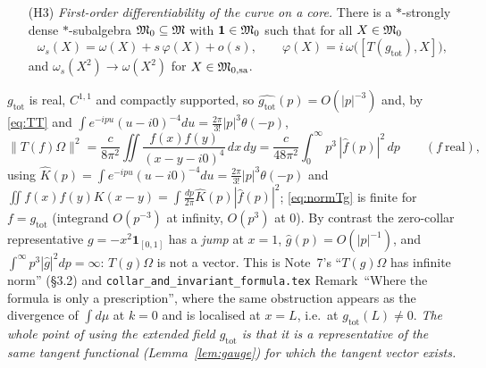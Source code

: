 \documentclass[11pt]{article}
\newcommand{\Om}{\Omega}
\newcommand{\one}{\mathbf 1}
\newcommand{\Hil}{\mathcal H}
\newcommand{\norm}[1]{\lVert#1\rVert}
\newcommand{\HT}{\Hil_T}
\newcommand{\gtot}{g_{\mathrm{tot}}}
\begin{document}
\begin{itemize}[leftmargin=3em]
\begin{itemize}[leftmargin=1.6em]
  with $\norm{\gtot-f_n}_{H^{3/2}}\to0$; equivalently $a:=T(\gtot)\Om\in\HT$
  (Definition~\ref{def:HT}).
 \end{itemize}
 (H2$'$) is what the Carpi--Weiner energy bound $\norm{T(f)\psi}\le C\norm f_{3/2}\norm{(1+L_0)\psi}$
 (CDIT Prop.~2.2(4)) delivers, and it is verified, together with (H1) and (H2), in
 \texttt{rigor/implementation\_C11.tex}.  Without it, (H2) alone would permit an operator $T(\gtot)$
 obtained by some other extension procedure whose vacuum vector differs from $\lim_nT(f_n)\Om$ by an
 element of $\HT^\perp$, and the $c$-linearity Theorem~\ref{thm:linear} would fail.
\item[(H3)] \emph{First-order differentiability of the curve on a core.}  There is a $*$-strongly dense
 $*$-subalgebra $\mathfrak M_0\subseteq\mathfrak M$ with $\one\in\cM_0$ such that for all $X\in\mathfrak M_0$
 \begin{equation}\label{eq:H3}
  \omega_s(X)=\omega(X)+s\,\varphi(X)+o(s),\qquad \varphi(X)=i\,\omega\bigl([T(\gtot),X]\bigr),
 \end{equation}
 and $\omega_s(X^2)\to\omega(X^2)$ for $X\in\mathfrak M_{0,\mathrm{sa}}$.
\end{itemize}

\begin{remark}[Why $T(\gtot)\Om$ is a vector while $T(g\mathbf 1_I)\Om$ is not]\label{rem:vector}
$\gtot$ is real, $C^{1,1}$ and compactly supported, so $\widehat{\gtot}(p)=O(|p|^{-3})$ and, by
\eqref{eq:TT} and $\int e^{-ipu}(u-i0)^{-4}du=\frac{2\pi}{3!}|p|^3\theta(-p)$,
\begin{equation}\label{eq:normTg}
 \norm{T(f)\Om}^2=\frac{c}{8\pi^2}\iint\frac{f(x)f(y)}{(x-y-i0)^4}\,dx\,dy
  =\frac{c}{48\pi^2}\int_0^\infty p^3\,|\widehat f(p)|^2\,dp\qquad (f\ \text{real}),
\end{equation}
using $\widehat K(p)=\int e^{-ipu}(u-i0)^{-4}du=\frac{2\pi}{3!}|p|^3\theta(-p)$ and
$\iint f(x)f(y)K(x-y)=\int\frac{dp}{2\pi}\widehat K(p)|\widehat f(p)|^2$;  \eqref{eq:normTg}
is finite for $f=\gtot$ (integrand $O(p^{-3})$ at infinity, $O(p^3)$ at $0$).  By contrast the zero-collar
representative $g=-x^2\mathbf 1_{[0,1]}$ has a \emph{jump} at $x=1$, $\widehat g(p)=O(|p|^{-1})$, and
$\int^\infty p^3|\widehat g|^2dp=\infty$: $T(g)\Om$ is not a vector.  This is Note~7's ``$T(g)\Om$ has infinite
norm'' (\S3.2) and \texttt{collar\_and\_invariant\_formula.tex} Remark~``Where the formula is only a
prescription'', where the same obstruction appears as the divergence of $\int d\mu$ at $k=0$ and is localised
at $x=L$, i.e.\ at $\gtot(L)\ne0$.  \emph{The whole point of using the extended field $\gtot$ is that it is a
representative of the same tangent functional (Lemma~\ref{lem:gauge}) for which the tangent vector exists.}
\end{remark}
\end{document}
